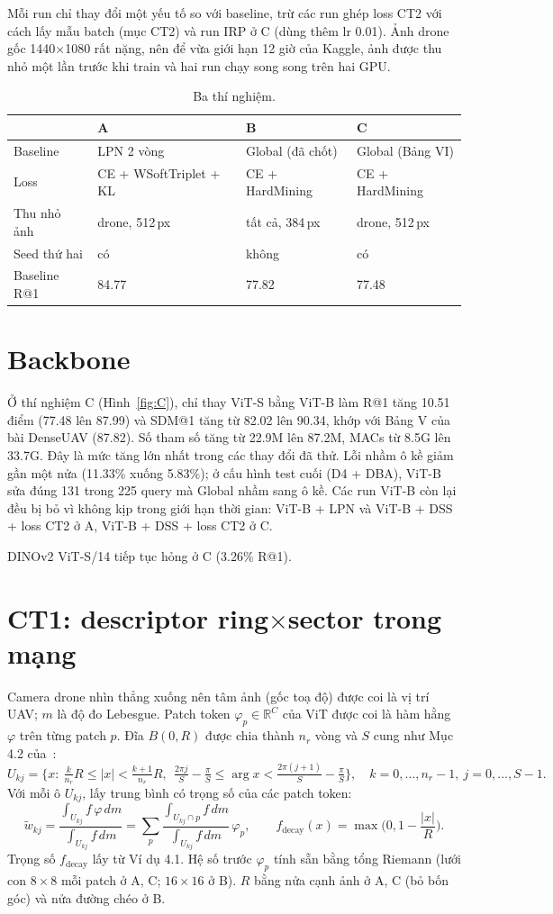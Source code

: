 \documentclass[11pt,a4paper]{article}
\begin{document}
Mỗi run chỉ thay đổi một yếu tố so với baseline, trừ các run ghép loss CT2 với cách lấy mẫu batch (mục CT2) và run IRP ở C (dùng thêm lr 0.01). Ảnh drone gốc 1440$\times$1080 rất nặng, nên để vừa giới hạn 12 giờ của Kaggle, ảnh được thu nhỏ một lần trước khi train và hai run chạy song song trên hai GPU.

\begin{table}[H]\centering\small
\caption{Ba thí nghiệm.}\label{tab:setup}
\begin{tabular}{@{}llll@{}}\toprule
& A & B & C\\\midrule
Baseline & LPN 2 vòng & Global (đã chốt) & Global (Bảng VI)\\
Loss & CE + WSoftTriplet + KL & CE + HardMining & CE + HardMining\\
Thu nhỏ ảnh & drone, 512\,px & tất cả, 384\,px & drone, 512\,px\\
Seed thứ hai & có & không & có\\
Baseline R@1 & 84.77 & 77.82 & 77.48\\\bottomrule
\end{tabular}
\end{table}

\section{Backbone}
Ở thí nghiệm C (Hình~\ref{fig:C}), chỉ thay ViT-S bằng ViT-B làm R@1 tăng 10.51 điểm (77.48 lên 87.99) và SDM@1 tăng từ 82.02 lên 90.34, khớp với Bảng V của bài DenseUAV (87.82). Số tham số tăng từ 22.9M lên 87.2M, MACs từ 8.5G lên 33.7G. Đây là mức tăng lớn nhất trong các thay đổi đã thử. Lỗi nhầm ô kề giảm gần một nửa (11.33\% xuống 5.83\%); ở cấu hình test cuối (D4 + DBA), ViT-B sửa đúng 131 trong 225 query mà Global nhầm sang ô kề. Các run ViT-B còn lại đều bị bỏ vì không kịp trong giới hạn thời gian: ViT-B + LPN và ViT-B + DSS + loss CT2 ở A, ViT-B + DSS + loss CT2 ở C.

DINOv2 ViT-S/14 tiếp tục hỏng ở C (3.26\% R@1).

\section{CT1: descriptor ring$\times$sector trong mạng}
Camera drone nhìn thẳng xuống nên tâm ảnh (gốc toạ độ) được coi là vị trí UAV; $m$ là độ đo Lebesgue. Patch token $\varphi_p\in\mathbb R^C$ của ViT được coi là hàm hằng $\varphi$ trên từng patch $p$. Đĩa $B(0,R)$ được chia thành $n_r$ vòng và $S$ cung như Mục 4.2 của~\cite{huu2026}:
\[
U_{kj}=\Big\{x:\ \tfrac{k}{n_r}R\le|x|<\tfrac{k+1}{n_r}R,\ \ \tfrac{2\pi j}{S}-\tfrac{\pi}{S}\le\arg x<\tfrac{2\pi (j+1)}{S}-\tfrac{\pi}{S}\Big\},
\quad k=0,\dots,n_r-1,\ j=0,\dots,S-1.
\]
Với mỗi ô $U_{kj}$, lấy trung bình có trọng số của các patch token:
\[
\tilde w_{kj}=\frac{\int_{U_{kj}} f\,\varphi\,dm}{\int_{U_{kj}} f\,dm}=\sum_{p}\frac{\int_{U_{kj}\cap p} f\,dm}{\int_{U_{kj}} f\,dm}\,\varphi_p,\qquad f_{\mathrm{decay}}(x)=\max\!\Big(0,1-\frac{|x|}{R}\Big).
\]
Trọng số $f_{\mathrm{decay}}$ lấy từ Ví dụ 4.1. Hệ số trước $\varphi_p$ tính sẵn bằng tổng Riemann (lưới con $8\times8$ mỗi patch ở A, C; $16\times16$ ở B). $R$ bằng nửa cạnh ảnh ở A, C (bỏ bốn góc) và nửa đường chéo ở B.
\end{document}
